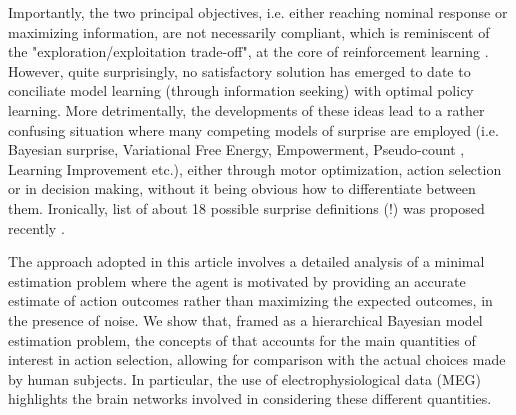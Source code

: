 \documentclass[10pt,letterpaper]{article}
\begin{document}
Importantly, the two principal objectives, i.e. either reaching nominal response or maximizing information, are not necessarily compliant, which is reminiscent of the  "exploration/exploitation trade-off", at the core of reinforcement learning \cite{sutton1998introduction}. However, quite surprisingly, no satisfactory solution has emerged to date to conciliate model learning (through information seeking) with optimal policy learning.
More detrimentally, the developments of these ideas lead to a rather confusing situation where many competing models of surprise are employed (i.e. Bayesian surprise, Variational Free Energy, Empowerment, Pseudo-count \cite{bellemare2016unifying}, Learning Improvement \cite{schmidhuber1991curious} etc.), either through motor optimization, action selection or in decision making, without it being obvious how to differentiate between them. Ironically, list of about 18 possible surprise definitions (!) was proposed recently \cite{modirshanechi2022taxonomy}. 

The approach adopted in this article involves a detailed analysis of a minimal estimation problem where the agent is motivated by providing an accurate estimate of action outcomes rather than maximizing the expected outcomes, in the presence of noise.  %
We show that, framed as a hierarchical Bayesian model estimation problem, the concepts of that accounts for the main quantities of interest in action selection, allowing  for comparison with the actual choices made by human subjects. In particular, the use of electrophysiological data (MEG) highlights the brain networks involved in considering these different quantities. %
\end{document}
